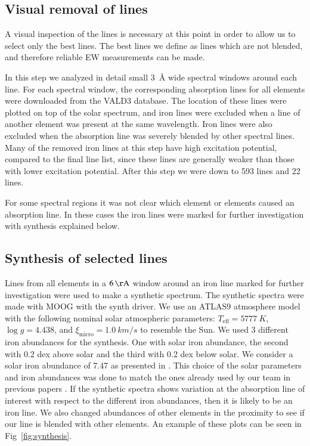 \documentclass{aa}
\begin{document}
\subsection{Visual removal of lines}
\label{sub:visual_removal_of_lines}

A visual inspection of the lines is necessary at this point in order to
allow us to select only the best lines. The best lines we define as lines
which are not blended, and therefore reliable EW measurements can be made.

In this step we analyzed in detail small \SI{3}{\angstrom} wide spectral
windows around each line. For each spectral window, the corresponding
absorption lines for all elements were downloaded from the VALD3 database.
The location of these lines were plotted on top of the solar
spectrum, and iron lines were excluded when a line of another element
was present at the same wavelength. Iron lines were also excluded when
the absorption line was severely blended by other spectral lines. Many
of the removed iron lines at this step have high excitation potential,
compared to the final line list, since these lines are generally weaker
than those with lower excitation potential. After this step we were down
to 593  lines and 22  lines.

For some spectral regions it was not clear which element or elements
caused an absorption line. In these cases the iron lines were marked for
further investigation with synthesis explained below.


\subsection{Synthesis of selected lines}
\label{sub:synthesis_of_selected_lines}

Lines from all elements in a $\SI{6}{\AA}$ window around an iron line
marked for further investigation were used to make a synthetic spectrum.
The synthetic spectra were made with MOOG with the synth driver. We use
an ATLAS9 atmosphere model \citep{Kurucz1993} with
the following nominal solar atmospheric parameters: $T_\mathrm{eff}=\SI{5777}{K}$,
$\log g = 4.438$, and $\xi_\mathrm{micro} = \SI{1.0}{km/s}$ to resemble
the Sun. We used 3 different iron abundances for the synthesis. One
with solar iron abundance, the second with 0.2 dex above solar and the
third with 0.2 dex below solar. We consider a solar iron abundance
of 7.47 as presented in \cite{Gonzalez2000}. This choice of the solar
parameters and iron abundances was done to match the ones already used
by our team in previous papers \citep[see e.g.][and references therein]{Santos13}.
If the synthetic spectra
shows variation at the absorption line of interest with respect to the
different iron abundances, then it is likely to be an iron line. We also
changed abundances of other elements in the proximity to see if our line
is blended with other elements. An example of these plots can be seen in
Fig~\ref{fig:synthesis}.
\end{document}
